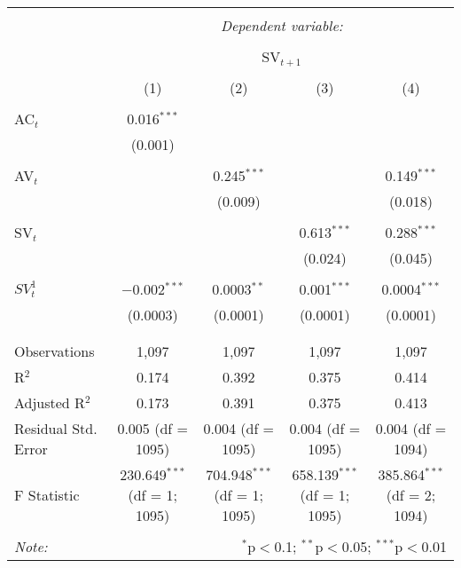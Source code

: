 
\begin{table}[!htbp] \centering 
  \caption{} 
  \label{} 
\begin{tabular}{@{\extracolsep{5pt}}lcccc} 
\\[-1.8ex]\hline 
\hline \\[-1.8ex] 
 & \multicolumn{4}{c}{\textit{Dependent variable:}} \\ 
\cline{2-5} 
\\[-1.8ex] & \multicolumn{4}{c}{SV$_{t+1}$} \\ 
\\[-1.8ex] & (1) & (2) & (3) & (4)\\ 
\hline \\[-1.8ex] 
 AC$_{t}$ & 0.016$^{***}$ &  &  &  \\ 
  & (0.001) &  &  &  \\ 
  & & & & \\ 
 AV$_{t}$ &  & 0.245$^{***}$ &  & 0.149$^{***}$ \\ 
  &  & (0.009) &  & (0.018) \\ 
  & & & & \\ 
 SV$_{t}$ &  &  & 0.613$^{***}$ & 0.288$^{***}$ \\ 
  &  &  & (0.024) & (0.045) \\ 
  & & & & \\ 
 $SV^{1}_{t}$ & $-$0.002$^{***}$ & 0.0003$^{**}$ & 0.001$^{***}$ & 0.0004$^{***}$ \\ 
  & (0.0003) & (0.0001) & (0.0001) & (0.0001) \\ 
  & & & & \\ 
\hline \\[-1.8ex] 
Observations & 1,097 & 1,097 & 1,097 & 1,097 \\ 
R$^{2}$ & 0.174 & 0.392 & 0.375 & 0.414 \\ 
Adjusted R$^{2}$ & 0.173 & 0.391 & 0.375 & 0.413 \\ 
Residual Std. Error & 0.005 (df = 1095) & 0.004 (df = 1095) & 0.004 (df = 1095) & 0.004 (df = 1094) \\ 
F Statistic & 230.649$^{***}$ (df = 1; 1095) & 704.948$^{***}$ (df = 1; 1095) & 658.139$^{***}$ (df = 1; 1095) & 385.864$^{***}$ (df = 2; 1094) \\ 
\hline 
\hline \\[-1.8ex] 
\textit{Note:}  & \multicolumn{4}{r}{$^{*}$p$<$0.1; $^{**}$p$<$0.05; $^{***}$p$<$0.01} \\ 
\end{tabular} 
\end{table} 

